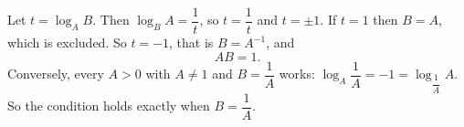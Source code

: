 Let $t=\log_A B$. Then $\log_B A=\dfrac{1}{t}$, so $t=\dfrac{1}{t}$ and $t=\pm1$. If $t=1$ then $B=A$, which is excluded. So $t=-1$, that is $B=A^{-1}$, and
\[
AB=\boxed{1}.
\]
Conversely, every $A>0$ with $A\ne1$ and $B=\dfrac{1}{A}$ works: $\log_A\dfrac{1}{A}=-1=\log_{\dfrac{1}{A}}A$. So the condition holds exactly when $B=\dfrac{1}{A}$.
